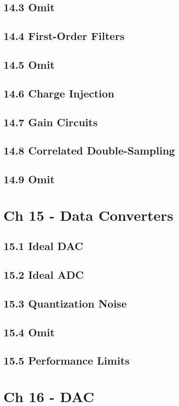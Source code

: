 \documentclass[a4paper,twocolumn]{article}
\begin{document}
    \subsection{14.3 Omit}
    \subsection{14.4 First-Order Filters}
    \subsection{14.5 Omit}
    \subsection{14.6 Charge Injection}
    \subsection{14.7 Gain Circuits}
    \subsection{14.8 Correlated Double-Sampling}
    \subsection{14.9 Omit}
  \section{Ch 15 - Data Converters}
    \subsection{15.1 Ideal DAC}
    \subsection{15.2 Ideal ADC}
    \subsection{15.3 Quantization Noise}
    \subsection{15.4 Omit}
    \subsection{15.5 Performance Limits}
  \section{Ch 16 - DAC}
\end{document}
